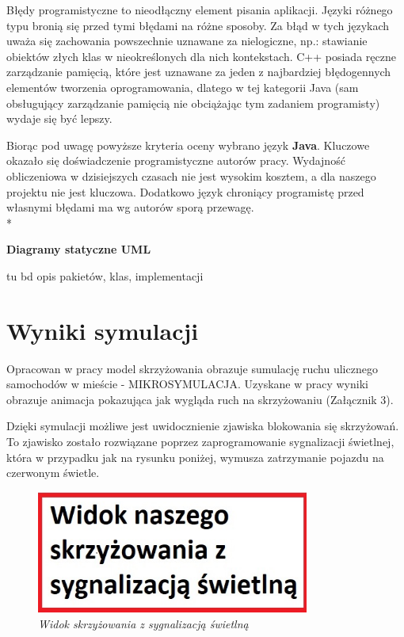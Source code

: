 \documentclass{sprawozdanie-agh}
\begin{document}
	Błędy programistyczne to nieodłączny element pisania aplikacji. Języki różnego typu bronią się przed tymi błędami na różne sposoby. Za błąd w tych językach uważa się zachowania powszechnie uznawane za nielogiczne, np.: stawianie obiektów złych klas w nieokreślonych dla nich kontekstach. C++ posiada ręczne zarządzanie pamięcią, które jest uznawane za jeden z najbardziej błędogennych elementów tworzenia oprogramowania, dlatego w tej kategorii Java (sam obsługujący zarządzanie pamięcią nie obciążając tym zadaniem programisty) wydaje się być lepszy.

	Biorąc pod uwagę powyższe kryteria oceny wybrano język \textbf{Java}. Kluczowe okazało się doświadczenie programistyczne autorów pracy. Wydajność obliczeniowa w dzisiejszych czasach nie jest wysokim kosztem, a dla naszego projektu nie jest kluczowa. Dodatkowo język chroniący programistę przed własnymi błędami ma wg autorów sporą przewagę. \\*

	\textbf{\normalsize{Diagramy statyczne UML}}

	tu bd opis pakietów, klas, implementacji




	\section{Wyniki symulacji}

	Opracowan w pracy model skrzyżowania obrazuje sumulację ruchu ulicznego samochodów w mieście - MIKROSYMULACJA. Uzyskane w pracy wyniki obrazuje animacja pokazująca jak wygląda ruch na skrzyżowaniu (Załącznik 3).

	Dzięki symulacji możliwe jest uwidocznienie zjawiska blokowania się skrzyżowań. To zjawisko zostało rozwiązane poprzez zaprogramowanie sygnalizacji świetlnej, która w przypadku jak na rysunku poniżej, wymusza zatrzymanie pojazdu na czerwonym świetle.

	\begin{figure}[H]
		\centering
		\includegraphics[width=0.8\textwidth]{Wyniki_sym_1.jpg}
		\caption{\textit{Widok skrzyżowania z sygnalizacją świetlną}}
		\label{fig:Wyniki_sym_1}
	\end{figure}
\end{document}
